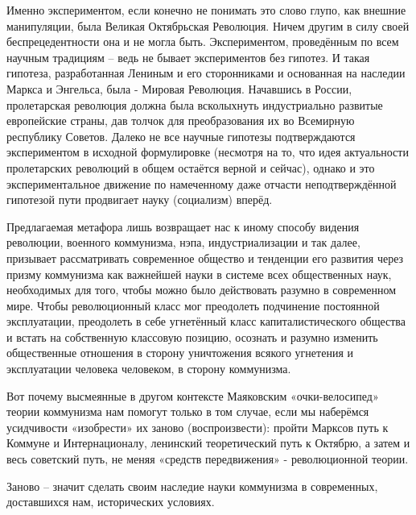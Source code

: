 \documentclass[../main]{subfiles}
\begin{document}
Именно экспериментом, если конечно не понимать это слово глупо, как внешние манипуляции, была Великая Октябрьская Революция. Ничем другим в силу своей беспрецедентности она и не могла быть. Экспериментом, проведённым по всем научным традициям – ведь не бывает экспериментов без гипотез. И такая гипотеза, разработанная Лениным и его сторонниками и основанная на наследии Маркса и Энгельса, была - Мировая Революция. Начавшись в России, пролетарская революция должна была всколыхнуть индустриально развитые европейские страны, дав толчок для преобразования их во Всемирную республику Советов. Далеко не все научные гипотезы подтверждаются экспериментом в исходной формулировке (несмотря на то, что идея актуальности пролетарских революций в общем остаётся верной и сейчас), однако и это экспериментальное движение по намеченному даже отчасти неподтверждённой гипотезой пути продвигает науку (социализм) вперёд.

Предлагаемая метафора лишь возвращает нас к иному способу видения революции, военного коммунизма, нэпа, индустриализации и так далее, призывает рассматривать современное общество и тенденции его развития через призму коммунизма как важнейшей науки в системе всех общественных наук, необходимых для того, чтобы можно было действовать разумно в современном мире. Чтобы революционный класс мог преодолеть подчинение постоянной эксплуатации, преодолеть в себе угнетённый класс капиталистического общества и встать на собственную классовую позицию, осознать и разумно изменить общественные отношения в сторону уничтожения всякого угнетения и эксплуатации человека человеком, в сторону коммунизма.

Вот почему высмеянные в другом контексте Маяковским «очки-велосипед» теории коммунизма нам помогут только в том случае, если мы наберёмся усидчивости «изобрести» их заново (воспроизвести): пройти Марксов путь к Коммуне и Интернационалу, ленинский теоретический путь к Октябрю, а затем и весь советский путь, не меняя «средств передвижения» - революционной теории.

Заново – значит сделать своим наследие науки коммунизма в современных, доставшихся нам, исторических условиях.
\end{document}
